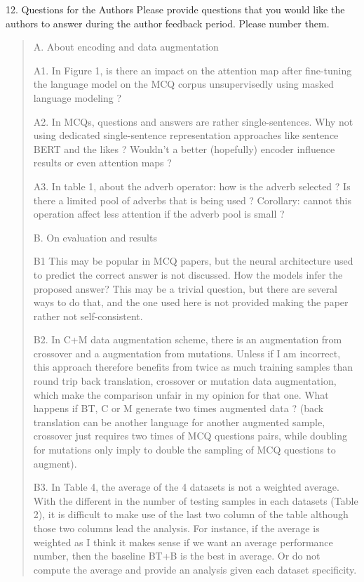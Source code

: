 \documentclass{article}
\begin{document}
12. {Questions for the Authors} Please provide questions that you would like the authors to answer during the author feedback period. Please number them.

\begin{quote}
A. About encoding and data augmentation

A1. In Figure 1, is there an impact on the attention map after fine-tuning the language model on the MCQ corpus unsupervisedly using masked language modeling ?

A2. In MCQs, questions and answers are rather single-sentences. Why not using dedicated single-sentence representation approaches like sentence BERT and the likes ? Wouldn't a better (hopefully) encoder influence results or even attention maps ?

A3. In table 1, about the adverb operator: how is the adverb selected ? Is there a limited pool of adverbs that is being used ? Corollary: cannot this operation affect less attention if the adverb pool is small ?

B. On evaluation and results

B1 This may be popular in MCQ papers, but the neural architecture used to predict the correct answer is not discussed. How the models infer the proposed answer? This may be a trivial question, but there are several ways to do that, and the one used here is not provided making the paper rather not self-consistent. 

B2. In C+M data augmentation scheme, there is an augmentation from crossover and a augmentation from mutations. Unless if I am incorrect, this approach therefore benefits from twice as much training samples than round trip back translation, crossover or mutation data augmentation, which make the comparison unfair in my opinion for that one. What happens if BT, C or M generate two times augmented data ? (back translation can be another language for another augmented sample, crossover just requires two times of MCQ questions pairs, while doubling for mutations only imply to double the sampling of MCQ questions to augment). 

B3. In Table 4, the average of the 4 datasets is not a weighted average. With the different in the number of testing samples in each datasets (Table 2), it is difficult to make use of the last two column of the table although those two columns lead the analysis. For instance, if the average is weighted as I think it makes sense if we want an average performance number, then the baseline BT+B is the best in average. Or do not compute the average and provide an analysis given each dataset specificity. 


\end{quote}
\end{document}

